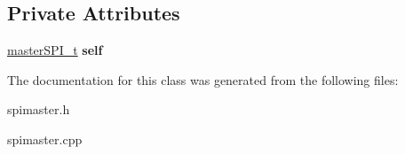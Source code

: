 \subsection*{Private Attributes}
\begin{DoxyCompactItemize}
\item 
\mbox{\label{classMasterSPI_ad92299e347f8e51309afc226daff5677}} 
\mbox{\hyperlink{structmasterSPI__t}{master\+S\+P\+I\+\_\+t}} {\bfseries self}
\end{DoxyCompactItemize}


The documentation for this class was generated from the following files\+:\begin{DoxyCompactItemize}
\item 
spimaster.\+h\item 
spimaster.\+cpp\end{DoxyCompactItemize}
